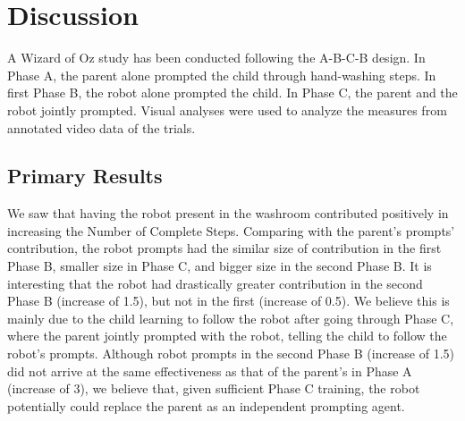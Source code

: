 \section{Discussion}
A Wizard of Oz study has been conducted following the A-B-C-B design.  In Phase A, the parent alone prompted the child through hand-washing steps.  In first Phase B, the robot alone prompted the child.  In Phase C, the parent and the robot jointly prompted.  Visual analyses were used to analyze the measures from annotated video data of the trials.



\subsection{Primary Results}
We saw that having the robot present in the washroom contributed positively in increasing the Number of Complete Steps.  Comparing with the parent's prompts' contribution, the robot prompts had the similar size of contribution in the first Phase B, smaller size in Phase C, and bigger size in the second Phase B.  It is interesting that the robot had drastically greater contribution in the second Phase B (increase of 1.5), but not in the first (increase of 0.5).  We believe this is mainly due to the child learning to follow the robot after going through Phase C, where the parent jointly prompted with the robot, telling the child to follow the robot's prompts.  Although robot prompts in the second Phase B (increase of 1.5) did not arrive at the same effectiveness as that of the parent's in Phase A (increase of 3), we believe that, given sufficient Phase C training, the robot potentially could replace the parent as an independent prompting agent.

